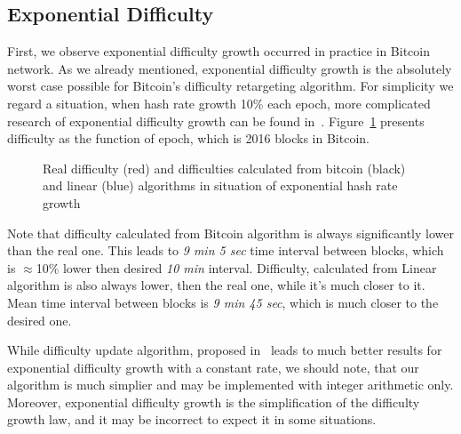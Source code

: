 \documentclass[]{llncs}
\begin{document}
\subsection{Exponential Difficulty}

First, we observe exponential difficulty growth occurred in practice in Bitcoin network. As we already mentioned, exponential difficulty growth is the absolutely worst case possible for Bitcoin’s difficulty retargeting algorithm.
For simplicity we regard a situation, when hash rate growth 10\% each epoch, more complicated research of exponential difficulty growth can be found in~\cite{kraft2015difficulty}.
Figure~\ref{fig:exp} presents difficulty as the function of epoch, which is 2016 blocks in Bitcoin.

\begin{figure}[h]
\caption{Real difficulty (red) and difficulties calculated from bitcoin (black) and linear (blue) algorithms in situation of exponential hash rate growth}
\label{fig:exp}
\end{figure}

Note that difficulty calculated from Bitcoin algorithm is always significantly lower than the real one.
This leads to \textit{9 min 5 sec} time interval between blocks, which is $\approx$10\% lower then desired \textit{10 min} interval.
Difficulty, calculated from Linear algorithm is also always lower, then the real one, while it's much closer to it.
Mean time interval between blocks is \textit{9 min 45 sec}, which is much closer to the desired one.

While difficulty update algorithm, proposed in~\cite{kraft2015difficulty} leads to much better results for exponential difficulty growth with a constant rate, we should note, that our algorithm is much simplier and may be implemented with integer arithmetic only.
Moreover, exponential difficulty growth is the simplification of the difficulty growth law, and it may be incorrect to expect it in some situations.
\end{document}
